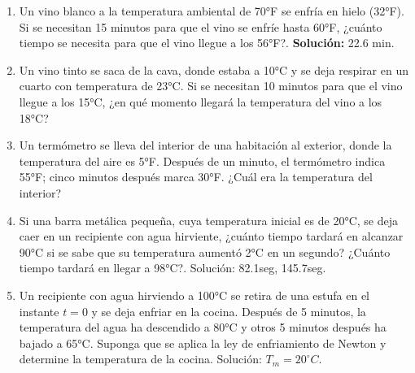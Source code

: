 \documentclass[letterpaper,10pt]{memoir}
\begin{document}
\begin{enumerate}
	\item Un vino blanco a la temperatura ambiental de 70°F se enfría en hielo (32°F). Si se necesitan 15 minutos para que el vino se enfríe hasta 60°F, ¿cuánto tiempo se necesita para que el vino llegue a los 56°F?. \textbf{Solución:} 22.6 min.
	\item Un vino tinto se saca de la cava, donde estaba a 10°C y se deja respirar en un cuarto con temperatura de 23°C. Si se necesitan 10 minutos para que el vino llegue a los 15°C, ¿en qué momento llegará la temperatura del vino a los 18°C?
	\item Un termómetro se lleva del interior de una habitación al exterior, donde la temperatura del aire es 5°F. Después de un minuto, el termómetro indica 55°F; cinco minutos después marca 30°F. ¿Cuál era la temperatura del interior?
	\item Si una barra metálica pequeña, cuya temperatura inicial es de 20°C, se deja caer en un recipiente con agua hirviente, ¿cuánto tiempo tardará en alcanzar 90°C si se sabe que su temperatura aumentó 2°C en un segundo? ¿Cuánto tiempo tardará en llegar a 98°C?. Solución: 82.1seg, 145.7seg.
	\item Un recipiente con agua hirviendo a 100°C se retira de una estufa en el instante \(t=0\) y se deja enfriar en la cocina. Después de 5 minutos, la temperatura del agua ha descendido a 80°C y otros 5 minutos después ha bajado a 65°C. Suponga que se aplica la ley de enfriamiento de Newton y determine la temperatura de la cocina. Solución: \(T_m=20 ^ \circ C\).
\end{enumerate}
\end{document}
